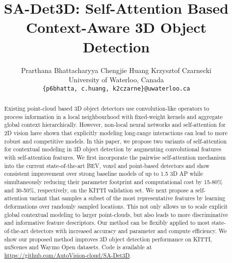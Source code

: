 \documentclass[10pt,twocolumn,letterpaper]{article}
\begin{document}
\title{SA-Det3D: Self-Attention Based Context-Aware 3D Object Detection}

\author{
Prarthana Bhattacharyya \hspace{0.5cm}  Chengjie Huang \hspace{0.5cm}  Krzysztof Czarnecki\\
University of Waterloo, Canada\\
{\tt\small \{p6bhatta, c.huang, k2czarne\}@uwaterloo.ca}
}
\maketitle




\begin{abstract}
\vspace{-0.3cm}
Existing point-cloud based 3D object detectors use convolution-like operators to process information in a local neighbourhood with fixed-weight kernels and aggregate global context hierarchically. However, non-local neural networks and self-attention for 2D vision have shown that explicitly modeling long-range interactions can lead to more robust and competitive models. In this paper, we propose two variants of self-attention for contextual modeling in 3D object detection by augmenting convolutional features with self-attention features. We first incorporate the pairwise self-attention mechanism into the current state-of-the-art BEV, voxel and point-based detectors and show consistent improvement over strong baseline models of up to 1.5 3D AP while simultaneously reducing their parameter footprint and computational cost by 15-80\% and 30-50\%, respectively, on the KITTI validation set. We next propose a self-attention variant that samples a subset of the most representative features by learning deformations over randomly sampled locations. This not only allows us to scale explicit global contextual modeling to larger point-clouds, but also leads to more discriminative and informative feature descriptors.  Our method can be flexibly applied to most state-of-the-art detectors with increased accuracy and parameter and compute efficiency. We show our proposed method improves 3D object detection performance on KITTI, nuScenes and Waymo Open datasets. Code is available at \textcolor{mypink1}{\url{https://github.com/AutoVision-cloud/SA-Det3D}}.
\vspace{-0.5cm}
\end{abstract}
\end{document}
